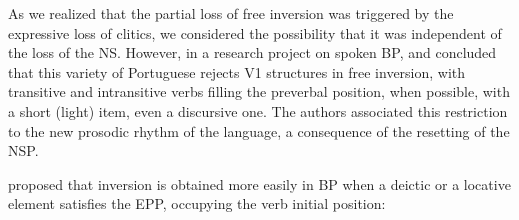 \documentclass[output=paper,colorlinks,citecolor=brown]{langscibook}
\begin{document}
As we realized that the partial loss of free inversion was triggered by the expressive loss of clitics, we considered the possibility that it was independent of the loss of the NS.  However, in a research project on spoken BP, \citet{kato2002b} and \citet{kato_semantic_2003} concluded that this variety of Portuguese rejects V1 structures in free inversion, with transitive and intransitive verbs filling the preverbal position, when possible, with a short (light) item, even a discursive one. The authors associated this restriction to the new prosodic rhythm of the language, a consequence of the resetting of the NSP.

\ea\label{ex:03:kato:8} %
   \label{ex:03:kato:8a}

   \label{ex:03:kato:8b}

    \label{ex:03:kato:8c}

    \label{ex:03:kato:8d}
   \z
\z

\citet{pilati_aspectos_2006} proposed that inversion is obtained more easily in BP when a deictic or a locative element satisfies the EPP, occupying the verb initial position:

\ea\label{ex:03:kato:9} %
   \label{ex:03:kato:9a}

   \label{ex:03:kato:9b}
\end{document}
